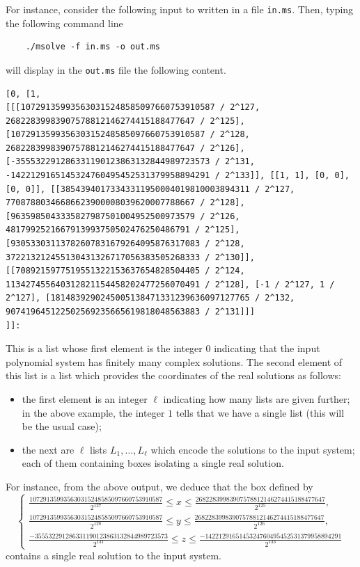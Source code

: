 \documentclass[a4paper,english,11pt]{scrartcl}
\theoremstyle{definition}
\theoremstyle{remark}
\def\leq{\leqslant}
\begin{document}
For instance, consider the following input to \msolve written in a file
\verb+in.ms+.
Then, typing the following command line
\begin{tcolorbox} %
  \begin{verbatim}
    ./msolve -f in.ms -o out.ms
  \end{verbatim}
\end{tcolorbox}
will display in the \verb+out.ms+ file the following content.
\begin{tcolorbox} %
  \begin{lstlisting}
[0, [1,
[[[107291359935630315248585097660753910587 / 2^127, 26822839983907578812146274415188477647 / 2^125], [107291359935630315248585097660753910587 / 2^128, 26822839983907578812146274415188477647 / 2^126], [-355532291286331190123863132844989723573 / 2^131, -1422129165145324760495452531379958894291 / 2^133]], [[1, 1], [0, 0], [0, 0]], [[38543940173343311950004019810003894311 / 2^127, 77087880346686623900008039620007788667 / 2^128], [9635985043335827987501004952500973579 / 2^126, 4817992521667913993750502476250486791 / 2^125], [93053303113782607831679264095876317083 / 2^128, 372213212455130431326717056383505268333 / 2^130]], [[7089215977519551322153637654828504405 / 2^124, 113427455640312821154458202477256070491 / 2^128], [-1 / 2^127, 1 / 2^127], [1814839290245005138471331239636097127765 / 2^132, 907419645122502569235665619818048563883 / 2^131]]]
]]:
  \end{lstlisting}
\end{tcolorbox}
This is a list whose first element is the integer $0$ indicating that the input
polynomial system has finitely many complex solutions. The second element of
this list is a list which provides the coordinates of the real solutions as
follows:
\begin{itemize}
\item the first element is an integer $\ell$ indicating how many lists are given
  further; in the above example, the integer $1$ tells that we have a single
  list (this will be the usual case);
\item the next are $\ell$ lists $L_1, \ldots, L_\ell$ which encode the solutions
  to the input system; each of them containing boxes isolating a single real
  solution.
\end{itemize}
For instance, from the above output, we deduce that the box defined by
\[
  \left \{
    \begin{array}{l}
      \frac{107291359935630315248585097660753910587}{2^{127}}
      \leq x \leq
      \frac{26822839983907578812146274415188477647}{2^{125}}, \\
      \frac{107291359935630315248585097660753910587}{2^{128}}
      \leq y \leq
      \frac{26822839983907578812146274415188477647}{2^{126}}, \\
      \frac{-355532291286331190123863132844989723573}{2^{131}}
      \leq z \leq
      \frac{-1422129165145324760495452531379958894291}{2^{133}}
\end{array}\right .
\]
contains a single real solution to the input system.
\end{document}
